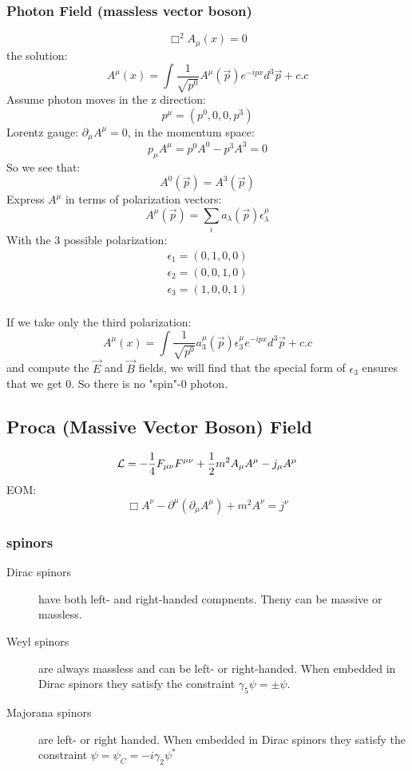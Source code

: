 \subsubsection{Photon Field (massless vector boson)}
\begin{equation}
    \Box^2 A_\mu(x) = 0
\end{equation}
the solution:
\begin{equation*}
    A^\mu(x) = \int \frac{1}{\sqrt{p^0}} A^\mu(\vec{p}) e^{-ipx} d^3\vec{p} + c.c
\end{equation*}
Assume photon moves in the z direction:
$$ p^\mu = (p^0, 0, 0, p^3)$$
Lorentz gauge: $\partial_\mu A^\mu = 0$, in the momentum space:
$$ p_\mu A^\mu = p^0A^0 - p^3 A^3 = 0 $$
So we see that:
$$ A^0(\vec{p}) = A^3(\vec{p}) $$
Express $A^\mu$ in terms of polarization vectors:
$$ A^\mu(\vec{p}) = \sum_i a_\lambda(\vec{p}) \epsilon_\lambda^\mu $$
With the 3 possible polarization:
\begin{gather*}
    \epsilon_1 = (0, 1, 0, 0)   \\
    \epsilon_2 = (0, 0, 1, 0)   \\
    \epsilon_3 = (1, 0, 0, 1)   \\
\end{gather*}

If we take only the third polarization:
$$  A^\mu(x) = \int \frac{1}{\sqrt{p^0}} a^\mu_3(\vec{p})\epsilon_3^\mu e^{-ipx} d^3\vec{p} + c.c $$
and compute the $\vec{E}$ and $\vec{B}$ fields, we will find that the special form
of $\epsilon_3$ ensures that we get 0. So there is no "spin"-0 photon.
\subsection{Proca (Massive Vector Boson) Field}
$$ \mathcal{L} = -\frac{1}{4}F_{\mu\nu}F^{\mu\nu} +
\frac{1}{2}m^{2}A_{\mu}A^{\mu} - j_{\mu}A^{\mu} $$
EOM:
$$ \Box A^{\nu} - \partial^{\mu}(\partial_{\mu}A^{\mu}) + m^{2}A^{\nu} =
j^{\nu}$$

\subsubsection{spinors}
\begin{description}
    \item[Dirac spinors] have both left- and right-handed compnents. Theny
	can be massive or massless.
    \item[Weyl spinors] are always massless and can be left- or
	right-handed. When embedded in Dirac spinors they satisfy the
	constraint $\gamma_5\psi=\pm\psi$.
    \item[Majorana spinors] are left- or right handed. When embedded in
	Dirac spinors they satisfy the constraint
	$\psi=\psi_C=-i\gamma_2\psi^*$
\end{description}

